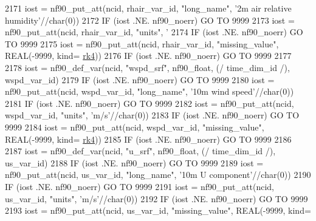 \begin{DoxyCode}
{2171     iost    = nf90\_put\_att(ncid, rhair\_var\_id, \textcolor{stringliteral}{"long\_name"}, \textcolor{stringliteral}{'2m air relative humidity'}//char(0))
2172     \textcolor{keywordflow}{IF} (iost .NE. nf90\_noerr) \textcolor{keywordflow}{GO TO} 9999
2173     iost    = nf90\_put\_att(ncid, rhair\_var\_id, \textcolor{stringliteral}{"units"}, \textcolor{stringliteral}{'%
2174     \textcolor{keywordflow}{IF} (iost .NE. nf90\_noerr) \textcolor{keywordflow}{GO TO} 9999
2175     iost    = nf90\_put\_att(ncid, rhair\_var\_id, \textcolor{stringliteral}{"missing\_value"}, \textcolor{keywordtype}{REAL}(-9999, kind=
      \hyperlink{namespaceportable_abaed22a509442771d3fba69bebda0b33}{rk4}))
2176     \textcolor{keywordflow}{IF} (iost .NE. nf90\_noerr) \textcolor{keywordflow}{GO TO} 9999
2177 
2178     iost    = nf90\_def\_var(ncid, \textcolor{stringliteral}{"wspd\_srf"}, nf90\_float, (/ time\_dim\_id /), wspd\_var\_id)
2179     \textcolor{keywordflow}{IF} (iost .NE. nf90\_noerr) \textcolor{keywordflow}{GO TO} 9999
2180     iost    = nf90\_put\_att(ncid, wspd\_var\_id, \textcolor{stringliteral}{"long\_name"}, \textcolor{stringliteral}{'10m wind speed'}//char(0))
2181     \textcolor{keywordflow}{IF} (iost .NE. nf90\_noerr) \textcolor{keywordflow}{GO TO} 9999
2182     iost    = nf90\_put\_att(ncid, wspd\_var\_id, \textcolor{stringliteral}{"units"}, \textcolor{stringliteral}{'m/s'}//char(0))
2183     \textcolor{keywordflow}{IF} (iost .NE. nf90\_noerr) \textcolor{keywordflow}{GO TO} 9999
2184     iost    = nf90\_put\_att(ncid, wspd\_var\_id, \textcolor{stringliteral}{"missing\_value"}, \textcolor{keywordtype}{REAL}(-9999, kind=
      \hyperlink{namespaceportable_abaed22a509442771d3fba69bebda0b33}{rk4}))
2185     \textcolor{keywordflow}{IF} (iost .NE. nf90\_noerr) \textcolor{keywordflow}{GO TO} 9999
2186 
2187     iost    = nf90\_def\_var(ncid, \textcolor{stringliteral}{"u\_srf"}, nf90\_float, (/ time\_dim\_id /), us\_var\_id)
2188     \textcolor{keywordflow}{IF} (iost .NE. nf90\_noerr) \textcolor{keywordflow}{GO TO} 9999
2189     iost    = nf90\_put\_att(ncid, us\_var\_id, \textcolor{stringliteral}{"long\_name"}, \textcolor{stringliteral}{'10m U component'}//char(0))
2190     \textcolor{keywordflow}{IF} (iost .NE. nf90\_noerr) \textcolor{keywordflow}{GO TO} 9999
2191     iost    = nf90\_put\_att(ncid, us\_var\_id, \textcolor{stringliteral}{"units"}, \textcolor{stringliteral}{'m/s'}//char(0))
2192     \textcolor{keywordflow}{IF} (iost .NE. nf90\_noerr) \textcolor{keywordflow}{GO TO} 9999
2193     iost    = nf90\_put\_att(ncid, us\_var\_id, \textcolor{stringliteral}{"missing\_value"}, \textcolor{keywordtype}{REAL}(-9999, kind=
}}
\end{DoxyCode}
